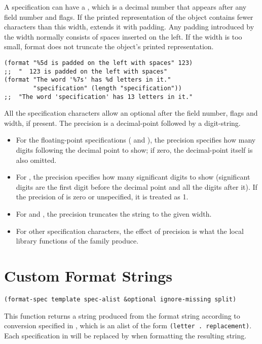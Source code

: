 A specification can have a , which is a decimal number that appears after any field number and flags.
If the printed representation of the object contains fewer characters than this width,  extends it with padding.
Any padding introduced by the width normally consists of spaces inserted on the left.
If the width is too small, format does not truncate the object’s printed representation.
\begin{lstlisting}
(format "%5d is padded on the left with spaces" 123)
;;  "  123 is padded on the left with spaces"
(format "The word '%7s' has %d letters in it."
        "specification" (length "specification"))
;;  "The word 'specification' has 13 letters in it."
\end{lstlisting}

All the specification characters allow an optional  after the field number, flags and width, if present.
The precision is a decimal-point  followed by a digit-string.
\begin{itemize}
\item For the floating-point specifications ( and ), the precision specifies how many digits following the decimal point to show; if zero, the decimal-point itself is also omitted.
\item  For , the precision specifies how many significant digits to show (significant digits are the first digit before the decimal point and all the digits after it). If the precision of  is zero or unspecified, it is treated as 1.
\item  For  and , the precision truncates the string to the given width.
\item  For other specification characters, the effect of precision is what the local library functions of the  family produce.
\end{itemize}

\section{Custom Format Strings}
\label{sec:cust-form-strings}

\begin{lstlisting}
(format-spec template spec-alist &optional ignore-missing split)
\end{lstlisting}
This function returns a string produced from the format string  according to conversion specified in , which is an alist of the form \lstinline|(letter . replacement)|.
Each specification  in  will be replaced by  when formatting the resulting string.

